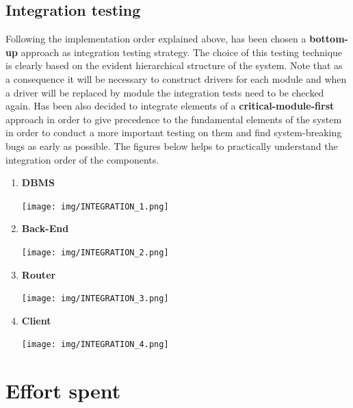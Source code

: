 \documentclass[a4paper]{report}
\begin{document}
\section{Integration testing}
Following the implementation order explained above, has been chosen a \textbf{bottom-up} approach as integration testing strategy. The choice of this testing technique is clearly based on the evident hierarchical structure of the system. Note that as a consequence it will be necessary to construct drivers for each module and when a driver will be replaced by module the integration tests need to be checked again. Has been also decided to integrate elements of a \textbf{critical-module-first} approach in order to give precedence to the fundamental elements of the system in order to conduct a more important testing on them and find system-breaking bugs as early as possible. The figures below helps to practically understand the integration order of the components.\newline
\begin{enumerate}
    \item \textbf{DBMS}\par
    \begin{minipage}{\linewidth}
        \centering
        \texttt{[image: img/INTEGRATION\_1.png]}
    \end{minipage}

    \item \textbf{Back-End}\par
    \begin{minipage}{\linewidth}
        \centering
        \texttt{[image: img/INTEGRATION\_2.png]}
    \end{minipage}\newline\newline

    \item \textbf{Router}\par
    \begin{minipage}{\linewidth}
        \centering
        \texttt{[image: img/INTEGRATION\_3.png]}
    \end{minipage}

    \item \textbf{Client}\par
    \begin{minipage}{\linewidth}
        \centering
        \texttt{[image: img/INTEGRATION\_4.png]}
    \end{minipage}
\end{enumerate}

\chapter{Effort spent}
\end{document}
